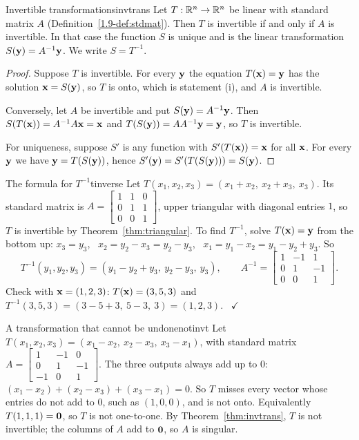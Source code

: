 \documentclass[11pt]{article}
\begin{document}
\begin{thm}{Invertible transformations}{invtrans}
Let $T:\mathbb{R}^n\to\mathbb{R}^n$ be linear with standard matrix $A$ (Definition~\ref{1.9-def:stdmat}). Then $T$ is invertible if and only if $A$ is invertible. In that case the function $S$ is unique and is the linear transformation $S(\mathbf{y})=A^{-1}\mathbf{y}$. We write $S=T^{-1}$.
\end{thm}

\begin{proof}
Suppose $T$ is invertible. For every $\mathbf{y}$ the equation $T(\mathbf{x})=\mathbf{y}$ has the solution $\mathbf{x}=S(\mathbf{y})$, so $T$ is onto, which is statement (i), and $A$ is invertible.

Conversely, let $A$ be invertible and put $S(\mathbf{y})=A^{-1}\mathbf{y}$. Then $S(T(\mathbf{x}))=A^{-1}A\mathbf{x}=\mathbf{x}$ and $T(S(\mathbf{y}))=AA^{-1}\mathbf{y}=\mathbf{y}$, so $T$ is invertible.

For uniqueness, suppose $S'$ is any function with $S'(T(\mathbf{x}))=\mathbf{x}$ for all $\mathbf{x}$. For every $\mathbf{y}$ we have $\mathbf{y}=T(S(\mathbf{y}))$, hence $S'(\mathbf{y})=S'(T(S(\mathbf{y})))=S(\mathbf{y})$.
\end{proof}

\begin{exmp}{The formula for $T^{-1}$}{tinverse}
Let $T(x_1,x_2,x_3)=(x_1+x_2,\ x_2+x_3,\ x_3)$. Its standard matrix is $A=\begin{bmatrix}1&1&0\\0&1&1\\0&0&1\end{bmatrix}$, upper triangular with diagonal entries $1$, so $T$ is invertible by Theorem~\ref{thm:triangular}. To find $T^{-1}$, solve $T(\mathbf{x})=\mathbf{y}$ from the bottom up: $x_3=y_3$, \ $x_2=y_2-x_3=y_2-y_3$, \ $x_1=y_1-x_2=y_1-y_2+y_3$. So
\[
T^{-1}(y_1,y_2,y_3)=(y_1-y_2+y_3,\ y_2-y_3,\ y_3),\qquad A^{-1}=\begin{bmatrix}1&-1&1\\0&1&-1\\0&0&1\end{bmatrix}.
\]
Check with $\mathbf{x}=(1,2,3)$: $T(\mathbf{x})=(3,5,3)$ and $T^{-1}(3,5,3)=(3-5+3,\ 5-3,\ 3)=(1,2,3)$. \ $\checkmark$
\end{exmp}

\begin{exmp}{A transformation that cannot be undone}{notinvt}
Let $T(x_1,x_2,x_3)=(x_1-x_2,\ x_2-x_3,\ x_3-x_1)$, with standard matrix $A=\begin{bmatrix}1&-1&0\\0&1&-1\\-1&0&1\end{bmatrix}$. The three outputs always add up to $0$: $(x_1-x_2)+(x_2-x_3)+(x_3-x_1)=0$. So $T$ misses every vector whose entries do not add to $0$, such as $(1,0,0)$, and is not onto. Equivalently $T(1,1,1)=\mathbf{0}$, so $T$ is not one-to-one. By Theorem~\ref{thm:invtrans}, $T$ is not invertible; the columns of $A$ add to $\mathbf{0}$, so $A$ is singular.
\end{exmp}
\end{document}
